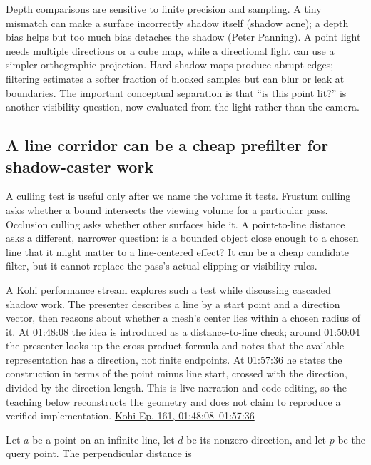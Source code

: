 Depth comparisons are sensitive to finite precision and sampling. A tiny mismatch can make a surface incorrectly shadow itself (shadow acne); a depth bias helps but too much bias detaches the shadow (Peter Panning). A point light needs multiple directions or a cube map, while a directional light can use a simpler orthographic projection. Hard shadow maps produce abrupt edges; filtering estimates a softer fraction of blocked samples but can blur or leak at boundaries. The important conceptual separation is that ``is this point lit?'' is another visibility question, now evaluated from the light rather than the camera.

\subsection{A line corridor can be a cheap prefilter for shadow-caster work}\label{04-visual-computing-ii-ch028-a-line-corridor-can-be-a-cheap-prefilter-for-shadow-caster-work}

A culling test is useful only after we name the volume it tests. Frustum culling asks whether a bound intersects the viewing volume for a particular pass. Occlusion culling asks whether other surfaces hide it. A point-to-line distance asks a different, narrower question: is a bounded object close enough to a chosen line that it might matter to a line-centered effect? It can be a cheap candidate filter, but it cannot replace the pass's actual clipping or visibility rules.

A Kohi performance stream explores such a test while discussing cascaded shadow work. The presenter describes a line by a start point and a direction vector, then reasons about whether a mesh's center lies within a chosen radius of it. At 01:48:08 the idea is introduced as a distance-to-line check; around 01:50:04 the presenter looks up the cross-product formula and notes that the available representation has a direction, not finite endpoints. At 01:57:36 he states the construction in terms of the point minus line start, crossed with the direction, divided by the direction length. This is live narration and code editing, so the teaching below reconstructs the geometry and does not claim to reproduce a verified implementation. \href{https://www.youtube.com/watch?v=dJYWL9YAelY&t=6488s}{Kohi Ep. 161, 01:48:08--01:57:36}

Let \(a\) be a point on an infinite line, let \(d\) be its nonzero direction, and let \(p\) be the query point. The perpendicular distance is

